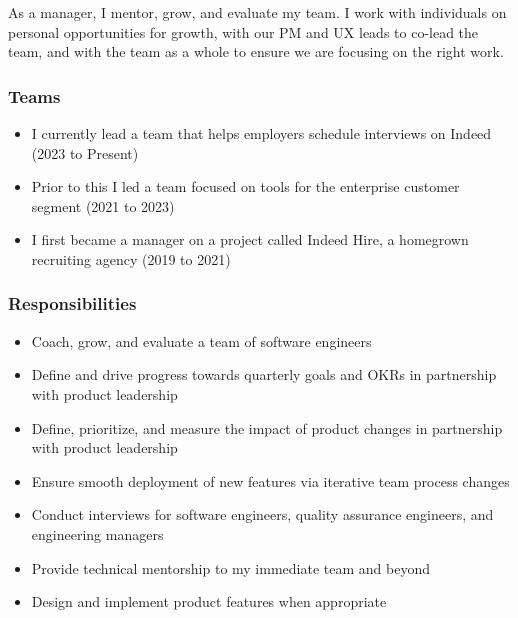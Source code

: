\documentclass[11pt]{amsart}
\begin{document}
% 
%
\begin{tcolorbox}[
	title=Software Engineering Manager \textcolor{DarkGray}{/} Indeed,
	after title={\hfill2019 \textcolor{DarkGray}{$\rightarrow$} Present \textcolor{DarkGray}{(6 years)}}
]

As a manager, I mentor, grow, and evaluate my team. I work with individuals on personal opportunities for growth, with our PM and UX leads to co-lead the team, and with the team as a whole to ensure we are focusing on the right work.

\subsubsection{Teams}

\begin{itemize}[noitemsep, leftmargin=2em, label=\raisebox{0.25ex}{\tiny$\bullet$}]
	\item I currently lead a team that helps employers schedule interviews on Indeed (2023 to Present)
	\item Prior to this I led a team focused on tools for the enterprise customer segment (2021 to 2023)
	\item I first became a manager on a project called Indeed Hire, a homegrown recruiting agency (2019 to 2021)
\end{itemize}

\subsubsection{Responsibilities}

\begin{itemize}[noitemsep, leftmargin=2em, label=\raisebox{0.25ex}{\tiny$\bullet$}]
	\item Coach, grow, and evaluate a team of software engineers
	\item Define and drive progress towards quarterly goals and \textsc{OKR}s in partnership with product leadership
	\item Define, prioritize, and measure the impact of product changes in partnership with product leadership
	\item Ensure smooth deployment of new features via iterative team process changes
	\item Conduct interviews for software engineers, quality assurance engineers, and engineering managers
	\item Provide technical mentorship to my immediate team and beyond
	\item Design and implement product features when appropriate
\end{itemize}


\end{tcolorbox}
\end{document}
